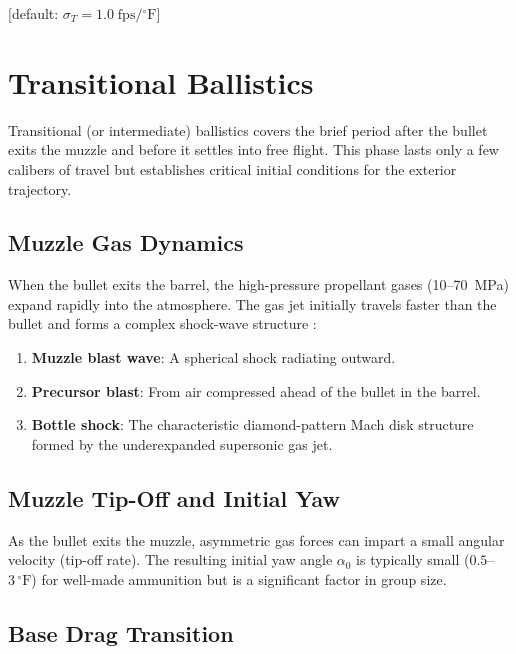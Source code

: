 \documentclass[11pt,twoside,openright]{report}
\newcommand{\degF}{{}^{\circ}\mathrm{F}}
\newcommand{\default}[1]{\;\textrm{\textcolor{blue!60!black}{[default: #1]}}}
\begin{document}
\default{$\sigma_T = 1.0\;\text{fps}/\degF$}


\chapter{Transitional Ballistics}
\label{ch:transitional}

Transitional (or intermediate) ballistics covers the brief period after the bullet exits the muzzle and before it settles into free flight. This phase lasts only a few calibers of travel but establishes critical initial conditions for the exterior trajectory.

\section{Muzzle Gas Dynamics}

When the bullet exits the barrel, the high-pressure propellant gases (\SI{10}{}--\SI{70}{\mega\pascal}) expand rapidly into the atmosphere. The gas jet initially travels faster than the bullet and forms a complex shock-wave structure \citep{carlucci2007ballistics}:

\begin{enumerate}
  \item \textbf{Muzzle blast wave}: A spherical shock radiating outward.
  \item \textbf{Precursor blast}: From air compressed ahead of the bullet in the barrel.
  \item \textbf{Bottle shock}: The characteristic diamond-pattern Mach disk structure formed by the underexpanded supersonic gas jet.
\end{enumerate}

\section{Muzzle Tip-Off and Initial Yaw}

As the bullet exits the muzzle, asymmetric gas forces can impart a small angular velocity (tip-off rate). The resulting initial yaw angle $\alpha_0$ is typically small ($0.5$--$3\,\degF$) for well-made ammunition but is a significant factor in group size.

\section{Base Drag Transition}
\end{document}
